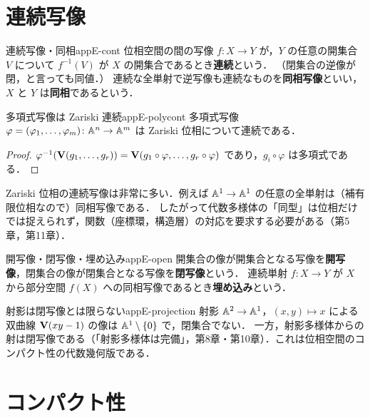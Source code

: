 \section{連続写像}

\begin{mydef}{連続写像・同相}{appE-cont}
位相空間の間の写像 $f\colon X\to Y$ が，$Y$ の任意の開集合 $V$ について $f^{-1}(V)$ が $X$ の開集合であるとき\textbf{連続}という．
（閉集合の逆像が閉，と言っても同値．）
連続な全単射で逆写像も連続なものを\textbf{同相写像}といい，$X$ と $Y$ は\textbf{同相}であるという．
\end{mydef}

\begin{myprop}{多項式写像は Zariski 連続}{appE-polycont}
多項式写像 $\varphi=(\varphi_1,\dots,\varphi_m)\colon\mathbb{A}^n\to\mathbb{A}^m$ は Zariski 位相について連続である．
\end{myprop}
\begin{proof}
$\varphi^{-1}(\mathbf{V}(g_1,\dots,g_r))=\mathbf{V}(g_1\circ\varphi,\dots,g_r\circ\varphi)$ であり，$g_i\circ\varphi$ は多項式である．
\end{proof}

\begin{note}
Zariski 位相の連続写像は非常に多い．例えば $\mathbb{A}^1\to\mathbb{A}^1$ の任意の全単射は（補有限位相なので）同相写像である．
したがって代数多様体の「同型」は位相だけでは捉えられず，関数（座標環，構造層）の対応を要求する必要がある（第5章，第11章）．
\end{note}

\begin{mydef}{開写像・閉写像・埋め込み}{appE-open}
開集合の像が開集合となる写像を\textbf{開写像}，閉集合の像が閉集合となる写像を\textbf{閉写像}という．
連続単射 $f\colon X\to Y$ が $X$ から部分空間 $f(X)$ への同相写像であるとき\textbf{埋め込み}という．
\end{mydef}

\begin{myex}{射影は閉写像とは限らない}{appE-projection}
射影 $\mathbb{A}^2\to\mathbb{A}^1$，$(x,y)\mapsto x$ による双曲線 $\mathbf{V}(xy-1)$ の像は $\mathbb{A}^1\setminus\{0\}$ で，閉集合でない．
一方，射影多様体からの射は閉写像である（「射影多様体は完備」，第8章・第10章）．これは位相空間のコンパクト性の代数幾何版である．
\end{myex}

\section{コンパクト性}

